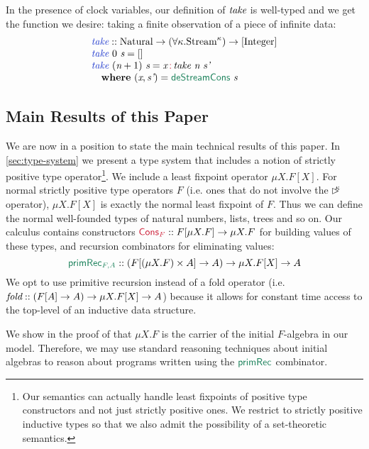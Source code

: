 In the presence of clock variables, our definition of $\textit{take}$
is well-typed and we get the function we desire: taking a finite
observation of a piece of infinite data:
\begin{displaymath}
  \begin{array}{l}
    \defn{take} :: \tyname{Natural} \to (\forall \kappa. \tyname{Stream}^\kappa) \to [\tyname{Integer}] \\
    \defn{take}\ 0\ \ident{s} = [] \\
    \defn{take}\ (\ident{n}+1)\ \ident{s} = \ident{x} \mathop{\cons{:}} \ident{take}\ \ident{n}\ \ident{s'} \\
    \quad \kw{where}\ (\ident{x}, \ident{s'}) = \elim{deStreamCons}\ \ident{s}
  \end{array}
\end{displaymath}

\subsection{Main Results of this Paper}
\label{sec:main-results-intro}

We are now in a position to state the main technical results of this
paper. In \autoref{sec:type-system} we present a type system that
includes a notion of strictly positive type operator\footnote{Our
  semantics can actually handle least fixpoints of positive type
  constructors and not just strictly positive ones. We restrict to
  strictly positive inductive types so that we also admit the
  possibility of a set-theoretic semantics.}. We include a least
fixpoint operator $\mu X. F[X]$. For normal strictly positive type
operators $F$ (i.e. ones that do not involve the $\mathord{\rhd\kern-0.4em^{\kappa}}$
operator), $\mu X. F[X]$ is exactly the normal least fixpoint of
$F$. Thus we can define the normal well-founded types of natural
numbers, lists, trees and so on. Our calculus contains constructors
$\cons{Cons$_F$} :: F[\mu X. F] \to \mu X. F$ for building values of
these types, and recursion combinators for eliminating values:
\begin{displaymath}
  \elim{primRec$_{F,A}$} :: (F[(\mu X. F) \times A] \to A) \to \mu X. F[X] \to A 
\end{displaymath}
We opt to use primitive recursion instead of a fold operator
(i.e. $\textit{fold} :: (F[A] \to A) \to \mu X. F[X] \to A$) because
it allows for constant time access to the top-level of an inductive
data structure.

We show in the proof of  that $\mu X. F$
is the carrier of the initial $F$-algebra in our model. Therefore, we
may use standard reasoning techniques about initial algebras to reason
about programs written using the $\elim{primRec}$ combinator.


